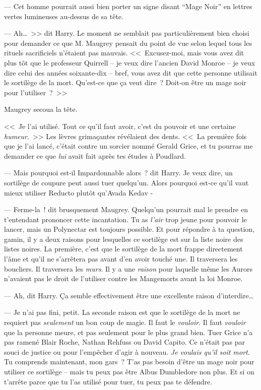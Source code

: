 --- Cet homme pourrait aussi bien porter un signe disant “Mage Noir” en lettres vertes lumineuses au-dessus de sa tête.

--- Ah…~>> dit Harry. Le moment ne semblait pas particulièrement bien choisi pour demander ce que M. Maugrey pensait du point de vue selon lequel tous les rituels sacrificiels n'étaient pas mauvais. <<~Excusez-moi, mais vous avez dit plus tôt que le professeur Quirrell -- je veux dire l'ancien David Monroe -- je veux dire celui des années soixante-dix -- bref, vous avez dit que cette personne utilisait le sortilège de la mort. Qu'est-ce que ça veut dire~? Doit-on être un mage noir pour l'utiliser~?~>>

Maugrey secoua la tête.

<<~Je l'ai utilisé. Tout ce qu'il faut avoir, c'est du pouvoir et une certaine \emph{humeur}.~>> Les lèvres grimaçantes révélaient des dents. <<~La première fois que je l'ai lancé, c'était contre un sorcier nommé Gerald Grice, et tu pourras me demander ce que \emph{lui} avait fait après tes études à Poudlard.

--- Mais pourquoi est-il Impardonnable alors~? dit Harry. Je veux dire, un sortilège de coupure peut aussi tuer quelqu'un. Alors pourquoi est-ce qu'il vaut mieux utiliser Reducto plutôt qu'Avada Kedav -

--- Ferme-la~! dit brusquement Maugrey. Quelqu'un pourrait mal le prendre en t'entendant prononcer cette incantation. Tu as \emph{l'air} trop jeune pour pouvoir le lancer, mais un Polynectar est toujours possible. Et pour répondre à ta question, gamin, il y a deux raisons pour lesquelles ce sortilège est sur la liste noire des listes noires. La première, c'est que le sortilège de la mort frappe directement l'âme et qu'il ne s'arrêtera pas avant d'en avoir touché une. Il traversera les boucliers. Il traversera les \emph{murs}. Il y a une \emph{raison} pour laquelle même les Aurors n'avaient pas le droit de l'utiliser contre les Mangemorts avant la loi Monroe.

--- Ah, dit Harry. Ça semble effectivement être une excellente raison d'interdire…

--- Je n'ai pas fini, petit. La seconde raison est que le sortilège de la mort ne requiert pas \emph{seulement} un bon coup de magie. Il faut le \emph{vouloir}. Il faut \emph{vouloir} que la personne meure, et pas seulement pour le plus grand bien. Tuer Grice n'a pas ramené Blair Roche, Nathan Rehfuss ou David Capito. Ce n'était pas par souci de justice ou pour l'empêcher d'agir à nouveau. \emph{Je voulais qu'il soit mort}. Tu comprends maintenant, mon gars~? T'as pas besoin d'être un mage noir pour utiliser ce sortilège -- mais tu peux pas être Albus Dumbledore non plus. Et si on t'arrête parce que tu l'as utilisé pour tuer, tu peux pas te défendre.

